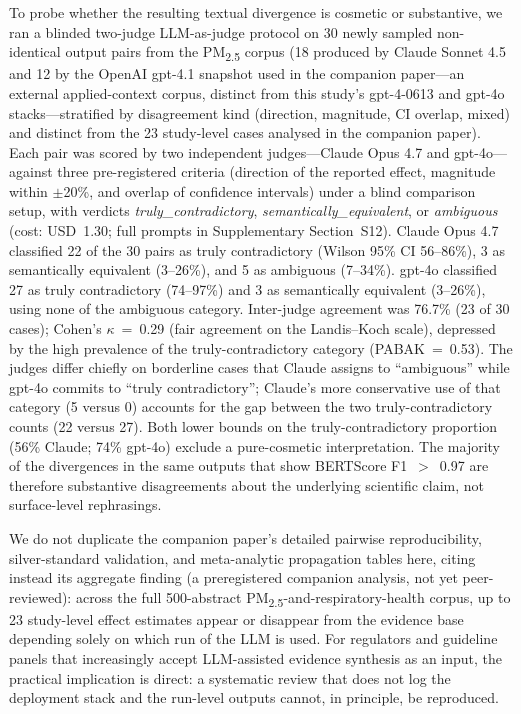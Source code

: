 \documentclass[11pt,a4paper]{article}
\begin{document}
{To probe whether the resulting textual divergence is cosmetic or substantive, we ran a blinded two-judge LLM-as-judge protocol on 30 newly sampled non-identical output pairs from the PM\textsubscript{2.5} corpus (18 produced by Claude Sonnet 4.5 and 12 by the OpenAI gpt-4.1 snapshot used in the companion paper---an external applied-context corpus, distinct from this study's gpt-4-0613 and gpt-4o stacks---stratified by disagreement kind (direction, magnitude, CI overlap, mixed) and distinct from the 23 study-level cases analysed in the companion paper). Each pair was scored by two independent judges---Claude Opus 4.7 and gpt-4o---against three pre-registered criteria (direction of the reported effect, magnitude within $\pm$20\%, and overlap of confidence intervals) under a blind comparison setup, with verdicts \emph{truly\_contradictory}, \emph{semantically\_equivalent}, or \emph{ambiguous} (cost: USD~1.30; full prompts in Supplementary Section~S12). Claude Opus 4.7 classified 22 of the 30 pairs as truly contradictory (Wilson 95\% CI 56--86\%), 3 as semantically equivalent (3--26\%), and 5 as ambiguous (7--34\%). gpt-4o classified 27 as truly contradictory (74--97\%) and 3 as semantically equivalent (3--26\%), using none of the ambiguous category. Inter-judge agreement was 76.7\% (23 of 30 cases); Cohen's $\kappa$~=~0.29 (fair agreement on the Landis--Koch scale), depressed by the high prevalence of the truly-contradictory category (PABAK~=~0.53). The judges differ chiefly on borderline cases that Claude assigns to ``ambiguous'' while gpt-4o commits to ``truly contradictory''; Claude's more conservative use of that category (5 versus 0) accounts for the gap between the two truly-contradictory counts (22 versus 27). Both lower bounds on the truly-contradictory proportion (56\% Claude; 74\% gpt-4o) exclude a pure-cosmetic interpretation. The majority of the divergences in the same outputs that show BERTScore F1~$>$~0.97 are therefore substantive disagreements about the underlying scientific claim, not surface-level rephrasings.

We do not duplicate the companion paper's detailed pairwise reproducibility, silver-standard validation, and meta-analytic propagation tables here, citing instead its aggregate finding (a preregistered companion analysis, not yet peer-reviewed): across the full 500-abstract PM\textsubscript{2.5}-and-respiratory-health corpus, up to 23 study-level effect estimates appear or disappear from the evidence base depending solely on which run of the LLM is used. For regulators and guideline panels that increasingly accept LLM-assisted evidence synthesis as an input, the practical implication is direct: a systematic review that does not log the deployment stack and the run-level outputs cannot, in principle, be reproduced.}
\end{document}
